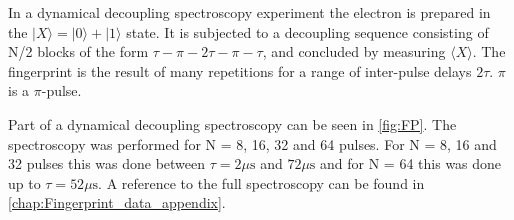 In a dynamical decoupling spectroscopy experiment the electron is prepared in the $|X\rangle = |0\rangle +|1\rangle$ state. It is subjected to a decoupling sequence consisting of N/2 blocks of the form {$\tau - \pi -2\tau-\pi-\tau$}, and concluded by measuring $\langle X\rangle $. The fingerprint is the result of many repetitions for a range of inter-pulse delays $2\tau$. $\pi$ is a $\pi$-pulse.

Part of a dynamical decoupling spectroscopy can be seen in \cref{fig:FP}. The spectroscopy was performed for N = 8, 16, 32 and 64 pulses. For N = 8, 16 and 32 pulses this was done between $\tau = 2 \mu \mathrm{s}$  and $72 \mu \mathrm{s}$ and for N = 64 this was done up to $\tau = 52 \mu \mathrm{s}$. A reference to the full spectroscopy can be found in \cref{chap:Fingerprint_data_appendix}.

